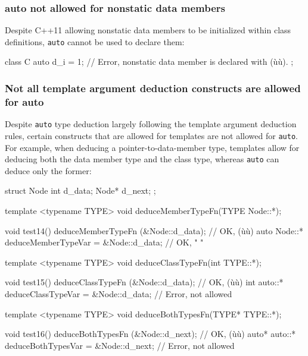 \subsubsection[\lstinline!auto! not allowed for nonstatic data members]{{\SubsubsecCode auto} not allowed for nonstatic data members}\label{auto-not-allowed-for-non-static-data-members}

Despite C++11 allowing nonstatic data members to be initialized within
class definitions, \lstinline!auto! cannot be used to declare them:

\begin{emcppslisting}
class C
{
    auto d_i = 1;  // Error, nonstatic data member is declared with (ù{}ù).
};
\end{emcppslisting}
    

\subsubsection[Not all template argument deduction constructs are allowed for \lstinline!auto!]{Not all template argument deduction constructs are allowed for {\SubsubsecCode auto}}\label{not-all-template-argument-deduction-constructs-are-allowed-for-auto}

Despite \lstinline!auto! type deduction largely following the template
argument deduction rules, certain constructs that are allowed for
templates are not allowed for \lstinline!auto!. For example, when deducing
a pointer-to-data-member type, templates allow for deducing both the
data member type and the class type, whereas \lstinline!auto! can 
deduce only the former:

\begin{emcppslisting}
struct Node
{
    int   d_data;
    Node* d_next;
};

template <typename TYPE>
void deduceMemberTypeFn(TYPE Node::*);

void test14()
{
                 deduceMemberTypeFn   (&Node::d_data);  // OK, (ù{}ù)
    auto Node::* deduceMemberTypeVar = &Node::d_data;   // OK,   "     "
}

template <typename TYPE>
void deduceClassTypeFn(int TYPE::*);

void test15()
{
                deduceClassTypeFn   (&Node::d_data);  // OK, (ù{}ù)
    int auto::* deduceClassTypeVar = &Node::d_data;   // Error, not allowed
}

template <typename TYPE>
void deduceBothTypesFn(TYPE* TYPE::*);

void test16()
{
                  deduceBothTypesFn   (&Node::d_next);  // OK, (ù{}ù)
    auto* auto::* deduceBothTypesVar = &Node::d_next;   // Error, not allowed
}
\end{emcppslisting}
    
